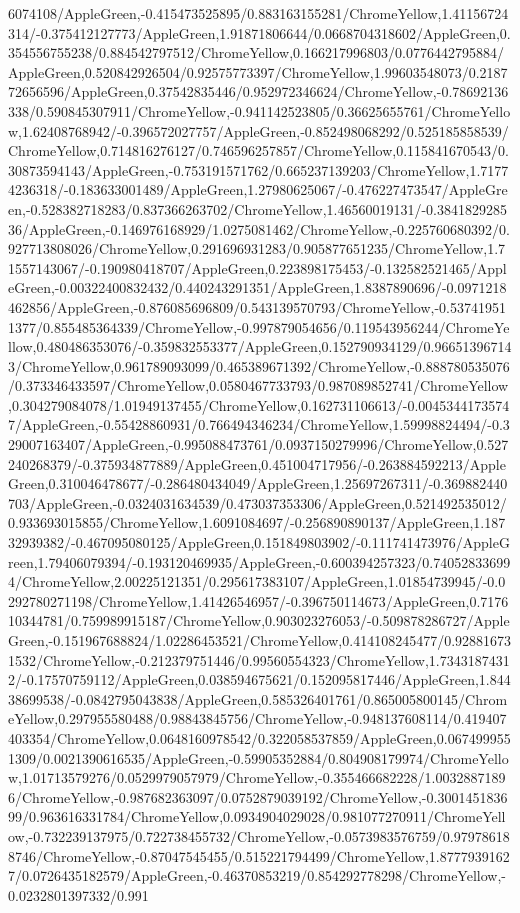{\begin{tikzternal}
6074108/AppleGreen,-0.415473525895/0.883163155281/ChromeYellow,1.41156724314/-0.375412127773/AppleGreen,1.91871806644/0.0668704318602/AppleGreen,0.354556755238/0.884542797512/ChromeYellow,0.166217996803/0.0776442795884/AppleGreen,0.520842926504/0.92575773397/ChromeYellow,1.99603548073/0.218772656596/AppleGreen,0.37542835446/0.952972346624/ChromeYellow,-0.78692136338/0.590845307911/ChromeYellow,-0.941142523805/0.36625655761/ChromeYellow,1.62408768942/-0.396572027757/AppleGreen,-0.852498068292/0.525185858539/ChromeYellow,0.714816276127/0.746596257857/ChromeYellow,0.115841670543/0.30873594143/AppleGreen,-0.753191571762/0.665237139203/ChromeYellow,1.71774236318/-0.183633001489/AppleGreen,1.27980625067/-0.476227473547/AppleGreen,-0.528382718283/0.837366263702/ChromeYellow,1.46560019131/-0.384182928536/AppleGreen,-0.146976168929/1.0275081462/ChromeYellow,-0.225760680392/0.927713808026/ChromeYellow,0.291696931283/0.905877651235/ChromeYellow,1.71557143067/-0.190980418707/AppleGreen,0.223898175453/-0.132582521465/AppleGreen,-0.00322400832432/0.440243291351/AppleGreen,1.8387890696/-0.0971218462856/AppleGreen,-0.876085696809/0.543139570793/ChromeYellow,-0.537419511377/0.855485364339/ChromeYellow,-0.997879054656/0.119543956244/ChromeYellow,0.480486353076/-0.359832553377/AppleGreen,0.152790934129/0.966513967143/ChromeYellow,0.961789093099/0.465389671392/ChromeYellow,-0.888780535076/0.373346433597/ChromeYellow,0.0580467733793/0.987089852741/ChromeYellow,0.304279084078/1.01949137455/ChromeYellow,0.162731106613/-0.00453441735747/AppleGreen,-0.55428860931/0.766494346234/ChromeYellow,1.59998824494/-0.329007163407/AppleGreen,-0.995088473761/0.0937150279996/ChromeYellow,0.527240268379/-0.375934877889/AppleGreen,0.451004717956/-0.263884592213/AppleGreen,0.310046478677/-0.286480434049/AppleGreen,1.25697267311/-0.369882440703/AppleGreen,-0.0324031634539/0.473037353306/AppleGreen,0.521492535012/0.933693015855/ChromeYellow,1.6091084697/-0.256890890137/AppleGreen,1.18732939382/-0.467095080125/AppleGreen,0.151849803902/-0.111741473976/AppleGreen,1.79406079394/-0.193120469935/AppleGreen,-0.600394257323/0.740528336994/ChromeYellow,2.00225121351/0.295617383107/AppleGreen,1.01854739945/-0.0292780271198/ChromeYellow,1.41426546957/-0.396750114673/AppleGreen,0.717610344781/0.759989915187/ChromeYellow,0.903023276053/-0.509878286727/AppleGreen,-0.151967688824/1.02286453521/ChromeYellow,0.414108245477/0.928816731532/ChromeYellow,-0.212379751446/0.99560554323/ChromeYellow,1.73431874312/-0.17570759112/AppleGreen,0.038594675621/0.152095817446/AppleGreen,1.84438699538/-0.0842795043838/AppleGreen,0.585326401761/0.865005800145/ChromeYellow,0.297955580488/0.98843845756/ChromeYellow,-0.948137608114/0.419407403354/ChromeYellow,0.0648160978542/0.322058537859/AppleGreen,0.0674999551309/0.0021390616535/AppleGreen,-0.59905352884/0.804908179974/ChromeYellow,1.01713579276/0.0529979057979/ChromeYellow,-0.355466682228/1.00328871896/ChromeYellow,-0.987682363097/0.0752879039192/ChromeYellow,-0.300145183699/0.963616331784/ChromeYellow,0.0934904029028/0.981077270911/ChromeYellow,-0.732239137975/0.722738455732/ChromeYellow,-0.0573983576759/0.979786188746/ChromeYellow,-0.87047545455/0.515221794499/ChromeYellow,1.87779391627/0.0726435182579/AppleGreen,-0.46370853219/0.854292778298/ChromeYellow,-0.0232801397332/0.991
\end{tikzternal}}
